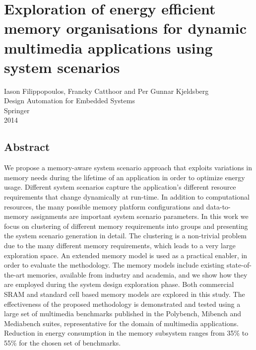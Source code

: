 \chapter{Exploration of energy efficient memory organisations for dynamic multimedia applications using system scenarios}

\begin{center}
Iason Filippopoulos, Francky Catthoor and Per Gunnar Kjeldsberg
\\
Design Automation for Embedded Systems
\\
Springer
\\
2014
\end{center}
\afterpage{\null\newpage}
\newpage

\vspace*{\fill}
\section*{\hspace*{\fill} Abstract \hspace*{\fill}}
We propose a memory-aware system scenario approach that exploits variations in memory needs during the lifetime of an application in order to optimize energy usage. 
Different system scenarios capture the application's different resource requirements that change dynamically at run-time. 
In addition to computational resources, the many possible memory platform configurations and data-to-memory assignments are important system scenario parameters. 
In this work we focus on clustering of different memory requirements into groups and presenting the system scenario generation in detail.
The clustering is a non-trivial problem due to the many different memory requirements, which leads to a very large exploration space.
An extended memory model is used as a practical enabler, in order to evaluate the methodology. 
The memory models include existing state-of-the-art memories, available from industry and academia, and we show how they are employed during the system design exploration phase. 
Both commercial SRAM and standard cell based memory models are explored in this study. 
The effectiveness of the proposed methodology is demonstrated and tested using a large set of multimedia benchmarks published in the Polybench, Mibench and Mediabench suites,
representative for the domain of multimedia applications.
Reduction in energy consumption in the memory subsystem ranges from 35\% to 55\% for the chosen set of benchmarks.
\vspace*{\fill}
\afterpage{\null\newpage}
\newpage

